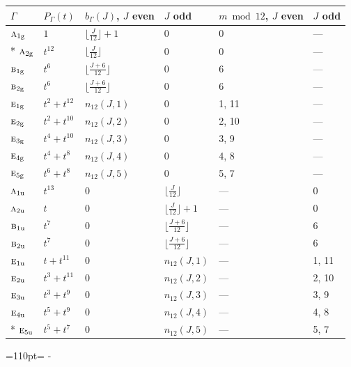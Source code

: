 \documentclass[10pt,a4paper]{article}
\newcommand{\needspace}[1]{\par\penalty-100\begingroup\dimen0=#1\relax\dimen2=\pagegoal
  \advance\dimen2-\pagetotal\ifdim\dimen0>\dimen2\relax\ifdim\dimen2>0pt\vfil\break\fi\fi
  \endgroup}
\numberwithin{equation}{section}
\newcommand{\irr}[1]{\text{\normalfont\scshape #1}}
\newcommand{\ptag}[1]{\mathrm{#1}}
\begin{document}
{\small{\renewcommand{\arraystretch}{1.3}\begin{longtable}{@{}llllll@{}}\toprule
$\Gamma$ & $P_\Gamma(t)$ & $b_\Gamma(J)$, $J$ even & $J$ odd & $m \bmod 12$, $J$ even & $J$ odd\\\midrule\endhead
\bottomrule\endfoot\endlastfoot
$\irr{a}_{1\ptag{g}}$ & $1$ & $\bigl\lfloor\tfrac{J}{12}\bigr\rfloor + 1$ & $0$ & 0 & ---\\*
$\irr{a}_{2\ptag{g}}$ & $t^{12}$ & $\bigl\lfloor\tfrac{J}{12}\bigr\rfloor$ & $0$ & 0 & ---\\
$\irr{b}_{1\ptag{g}}$ & $t^{6}$ & $\bigl\lfloor\tfrac{J+6}{12}\bigr\rfloor$ & $0$ & 6 & ---\\
$\irr{b}_{2\ptag{g}}$ & $t^{6}$ & $\bigl\lfloor\tfrac{J+6}{12}\bigr\rfloor$ & $0$ & 6 & ---\\
$\irr{e}_{1\ptag{g}}$ & $t^{2} + t^{12}$ & $n_{12}(J,1)$ & $0$ & 1, 11 & ---\\
$\irr{e}_{2\ptag{g}}$ & $t^{2} + t^{10}$ & $n_{12}(J,2)$ & $0$ & 2, 10 & ---\\
$\irr{e}_{3\ptag{g}}$ & $t^{4} + t^{10}$ & $n_{12}(J,3)$ & $0$ & 3, 9 & ---\\
$\irr{e}_{4\ptag{g}}$ & $t^{4} + t^{8}$ & $n_{12}(J,4)$ & $0$ & 4, 8 & ---\\
$\irr{e}_{5\ptag{g}}$ & $t^{6} + t^{8}$ & $n_{12}(J,5)$ & $0$ & 5, 7 & ---\\
$\irr{a}_{1\ptag{u}}$ & $t^{13}$ & $0$ & $\bigl\lfloor\tfrac{J}{12}\bigr\rfloor$ & --- & 0\\
$\irr{a}_{2\ptag{u}}$ & $t$ & $0$ & $\bigl\lfloor\tfrac{J}{12}\bigr\rfloor + 1$ & --- & 0\\
$\irr{b}_{1\ptag{u}}$ & $t^{7}$ & $0$ & $\bigl\lfloor\tfrac{J+6}{12}\bigr\rfloor$ & --- & 6\\
$\irr{b}_{2\ptag{u}}$ & $t^{7}$ & $0$ & $\bigl\lfloor\tfrac{J+6}{12}\bigr\rfloor$ & --- & 6\\
$\irr{e}_{1\ptag{u}}$ & $t + t^{11}$ & $0$ & $n_{12}(J,1)$ & --- & 1, 11\\
$\irr{e}_{2\ptag{u}}$ & $t^{3} + t^{11}$ & $0$ & $n_{12}(J,2)$ & --- & 2, 10\\
$\irr{e}_{3\ptag{u}}$ & $t^{3} + t^{9}$ & $0$ & $n_{12}(J,3)$ & --- & 3, 9\\
$\irr{e}_{4\ptag{u}}$ & $t^{5} + t^{9}$ & $0$ & $n_{12}(J,4)$ & --- & 4, 8\\*
$\irr{e}_{5\ptag{u}}$ & $t^{5} + t^{7}$ & $0$ & $n_{12}(J,5)$ & --- & 5, 7\\
\bottomrule\end{longtable}}}
\needspace{110pt}
\end{document}
